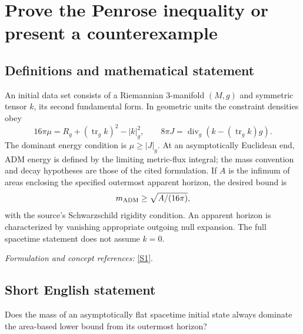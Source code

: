 \documentclass[11pt,a4paper]{article}
\newcommand{\sref}[2]{\hyperlink{source:#1:#2}{[S#2]}}
\newif\ifshowcatalogue
\newcommand{\cataloguescope}[1]{\ifshowcatalogue
 \paragraph{Exact scope in the supplied catalogue.}
 \begin{quote}\small #1\end{quote}\fi}
\numberwithin{equation}{section}
\begin{document}
\setcounter{section}{0}
\clearpage
\section*{\texorpdfstring{Prove the Penrose inequality or present a counterexample}{Prove the Penrose inequality or present a counterexample}}\label{30006689}
\subsection{Definitions and mathematical statement}
An initial data set consists of a Riemannian $3$-manifold $(M,g)$ and symmetric tensor $k$, its second fundamental form. In geometric units the constraint densities obey
\[
 16\pi\mu=R_g+(\operatorname{tr}_gk)^2-|k|_g^2,\qquad
 8\pi J=\operatorname{div}_g(k-(\operatorname{tr}_gk)g).
\]
The dominant energy condition is $\mu\ge|J|_g$. At an asymptotically Euclidean end, ADM energy is defined by the limiting metric-flux integral; the mass convention and decay hypotheses are those of the cited formulation. If $A$ is the infimum of areas enclosing the specified outermost apparent horizon, the desired bound is
\[
 m_{\rm ADM}\ge\sqrt{A/(16\pi)},
\]
with the source's Schwarzschild rigidity condition. An apparent horizon is characterized by vanishing appropriate outgoing null expansion. The full spacetime statement does not assume $k=0$.
\par\smallskip\textit{Formulation and concept references:} \sref{30006689}{1}.
\cataloguescope{Let (M,g,k) be a three-dimensional asymptotically flat initial data set for the Einstein equations satisfying the dominant energy condition and containing an outermost apparent horizon. If A is the least area needed to enclose that horizon and m\_ADM is the ADM mass, prove the sharp spacetime Penrose inequality m\_ADM >= sqrt(A/(16*pi)), with the appropriate Schwarzschild rigidity statement, or construct initial data satisfying the hypotheses that violate the inequality.}
\subsection{Short English statement}
Does the mass of an asymptotically flat spacetime initial state always dominate the area-based lower bound from its outermost horizon?
\end{document}
